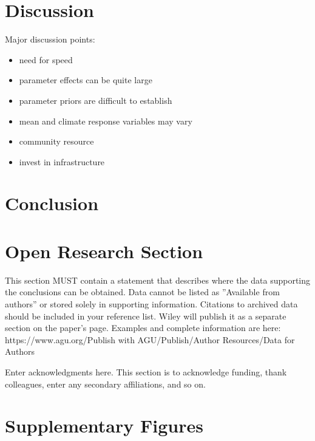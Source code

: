 \documentclass[draft]{agujournal2019}
\begin{document}
\section{Discussion}

Major discussion points:
\begin{itemize}
\item need for speed
\item parameter effects can be quite large
\item parameter priors are difficult to establish
\item mean and climate response variables may vary
\item community resource
\item invest in infrastructure
\end{itemize}

\section{Conclusion}
\section*{Open Research Section}
This section MUST contain a statement that describes where the data supporting the conclusions can be obtained. Data cannot be listed as ''Available from authors'' or stored solely in supporting information. Citations to archived data should be included in your reference list. Wiley will publish it as a separate section on the paper’s page. Examples and complete information are here:
https://www.agu.org/Publish with AGU/Publish/Author Resources/Data for Authors


\acknowledgments
Enter acknowledgments here. This section is to acknowledge funding, thank colleagues, enter any secondary affiliations, and so on.






\appendix
\section{Supplementary Figures}
\end{document}
